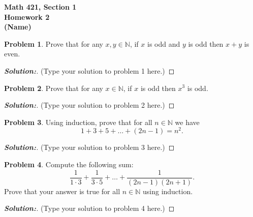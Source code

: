 \documentclass[12pt]{article}
\theoremstyle{definition}\newtheorem{problem}{Problem}
\newenvironment{solution}{\begin{proof}[\bfseries\textup{Solution:}]}{\end{proof}}
\begin{document}

\begin{center}
\bfseries Math 421, Section 1 
\\ 
Homework 2
\\ 
(Name) %
\\ [24pt] 
\end{center}

\begin{problem}
Prove that for any $x,y\in\mathbb{N}$, if $x$ is odd and $y$ is odd then $x+y$ is even.
\end{problem}
\begin{solution}
(Type your solution to problem 1 here.)
\end{solution}

\newpage
\begin{problem}
Prove that for any $x\in\mathbb{N}$, if $x$ is odd then $x^3$ is odd.
\end{problem}
\begin{solution}
(Type your solution to problem 2 here.)
\end{solution}

\newpage
\begin{problem}
Using induction, prove that for all $n\in\mathbb{N}$ we have
\begin{equation*}
1+3+5+\dots+(2n-1) = n^2 .
\end{equation*}
\end{problem}
\begin{solution}
(Type your solution to problem 3 here.)
\end{solution}

\newpage
\begin{problem}
Compute the following sum:
\begin{equation*}
\frac{1}{1\cdot 3} + \frac{1}{3\cdot 5} + \dots + \frac{1}{(2n-1)(2n+1)} .
\end{equation*}
Prove that your answer is true for all $n\in\mathbb{N}$ using induction.
\end{problem}
\begin{solution}
(Type your solution to problem 4 here.)
\end{solution}
\end{document}
